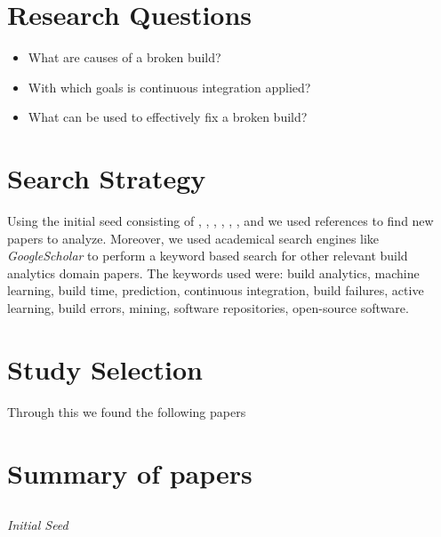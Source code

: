 \documentclass[]{book}
\providecommand{\tightlist}{%
  \setlength{\itemsep}{0pt}\setlength{\parskip}{0pt}}
\begin{document}
\section{Research Questions}\label{research-questions}

\begin{itemize}
\tightlist
\item
  What are causes of a broken build?
\item
  With which goals is continuous integration applied?
\item
  What can be used to effectively fix a broken build?
\end{itemize}

\section{Search Strategy}\label{search-strategy}

Using the initial seed consisting of \citet{bird2017predicting},
\citet{beller2017oops}, \citet{rausch2017empirical},
\citet{beller2017travistorrent}, \citet{pinto2018work},
\citet{zhao2017impact}, \citet{widder2018m} and \citet{hilton2016usage}
we used references to find new papers to analyze. Moreover, we used
academical search engines like \emph{GoogleScholar} to perform a keyword
based search for other relevant build analytics domain papers. The
keywords used were: build analytics, machine learning, build time,
prediction, continuous integration, build failures, active learning,
build errors, mining, software repositories, open-source software.

\section{Study Selection}\label{study-selection}

Through this we found the following papers

\section{Summary of papers}\label{summary-of-papers}

\subsection{\texorpdfstring{\citet{bird2017predicting}}{@bird2017predicting}}\label{bird2017predicting}

\emph{Initial Seed}
\end{document}
